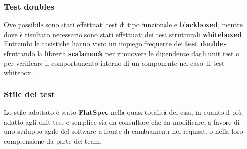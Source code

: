 \subsubsection{Test doubles}
Ove possibile sono stati effettuati test di tipo funzionale e \textbf{blackboxed}, mentre dove è risultato necessario sono stati effettuati dei test strutturali \textbf{whiteboxed}.
%
Entrambi le casistiche hanno visto un impiego frequente dei \textbf{test doubles} sfruttando la libreria \textbf{scalamock} per rimuovere le dipendenze dagli unit test o per verificare il comportamento interno di un componente nel caso di test whitebox.

\subsubsection{Stile dei test}
Lo stile adottato è stato \textbf{FlatSpec} nella quasi totalità dei casi, in quanto il più adatto agli unit test e semplice sia da consultare che da modificare, a favore di uno sviluppo agile del software a fronte di cambiamenti nei requisiti o nella loro comprensione da parte del team.